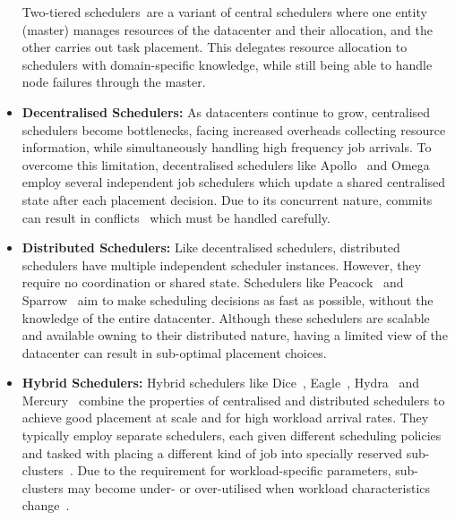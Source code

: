 \begin{itemize}
        Two-tiered schedulers~\cite{hindman2011mesos}are a variant of central schedulers where
        one entity (master) manages resources of the datacenter and their
        allocation, and the other carries out task placement. This delegates
        resource allocation to schedulers with domain-specific knowledge, while
        still being able to handle node failures through the master.
    \item \textbf{Decentralised Schedulers:} As datacenters continue to grow,
        centralised schedulers become bottlenecks, facing increased overheads
        collecting resource information, while simultaneously handling high
        frequency job arrivals. To overcome this limitation, decentralised
        schedulers like Apollo~\cite{boutin2014apollo} and
        Omega~\cite{schwarzkopf2013omega} employ several independent job
        schedulers which update a shared centralised state after each placement
        decision. Due to its concurrent nature, commits can result in
        conflicts~\cite{schwarzkopf2013omega} which must be handled carefully.
    \item \textbf{Distributed Schedulers:} Like decentralised schedulers,
        distributed schedulers have multiple independent scheduler instances.
        However, they require no coordination or shared state. Schedulers like
        Peacock~\cite{khelghatdoust2018peacock} and Sparrow~\cite{ousterhout2013sparrow} aim to make scheduling decisions
        as fast as possible, without the knowledge of the entire datacenter.
        Although these schedulers are scalable and available owning to their
        distributed nature, having a limited view of the datacenter can result
        in sub-optimal placement choices.
    \item \textbf{Hybrid Schedulers:} Hybrid schedulers like Dice~\cite{zhou2019improving},
        Eagle~\cite{delgado2016job}, Hydra~\cite{curino2019hydra} and Mercury~\cite{karanasos2015mercury} combine the
        properties of centralised and distributed schedulers to achieve good
        placement at scale and for high workload arrival rates. They typically
        employ separate schedulers, each given different scheduling policies and
        tasked with placing a different kind of job into specially reserved
        sub-clusters~\cite{delgado2016job,delgado2015hawk,karanasos2015mercury,wang2019pigeon}. Due to the requirement for
        workload-specific parameters, sub-clusters may become under- or
        over-utilised when workload characteristics change~\cite{gog_firmament_2016}.
\end{itemize}

